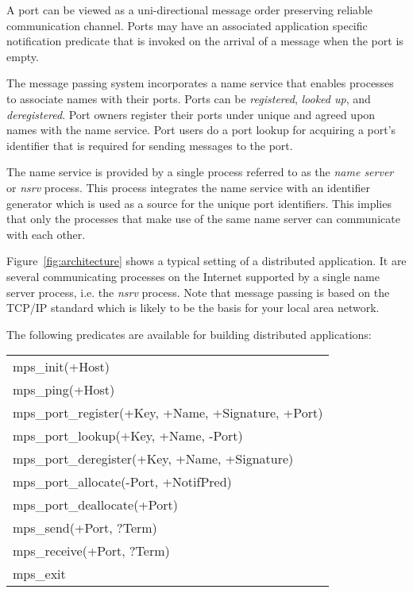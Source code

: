 A port can be viewed as a uni-directional message order preserving
reliable communication channel. Ports may have an associated
application specific notification predicate that is invoked
on the arrival of a message when the port is empty.

The \eclipse message passing system incorporates a name service
that enables processes to associate names with their ports. Ports
can be {\it registered}, {\it looked up}, and {\it deregistered}.
Port owners register their ports under unique and agreed upon names 
with the name service. Port users do a port lookup for acquiring a 
port's identifier that is required for sending messages to the port.

The name service is provided by a single process referred to as the
{\it name server} or {\it nsrv} process. This process integrates the
name service with an identifier generator which is used as a source
for the unique port identifiers. This implies that only the processes
that make use of the same name server can communicate with each other. 

\begin{figure}[hbt]
\centerline{}
\center{
\caption{\label{fig:architecture}
         {Distributed \eclipse Architecture}}}
\end{figure}

Figure~\ref{fig:architecture} shows a typical setting of a distributed
\eclipse application. It are several communicating \eclipse processes
on the Internet supported by a single name server process, i.e. the
{\it nsrv} process. Note that \eclipse message passing is based on
the TCP/IP standard which is likely to be the basis for your local area
network.

The following predicates are available for building distributed \eclipse
applications:

\begin{center}
\begin{tabular}{l}
mps\_init(+Host) \\
mps\_ping(+Host) \\
mps\_port\_register(+Key, +Name, +Signature, +Port) \\
mps\_port\_lookup(+Key, +Name, -Port) \\
mps\_port\_deregister(+Key, +Name, +Signature) \\
mps\_port\_allocate(-Port, +NotifPred) \\
mps\_port\_deallocate(+Port) \\
mps\_send(+Port, ?Term) \\
mps\_receive(+Port, ?Term) \\
mps\_exit \\
\end{tabular}
\end{center}

